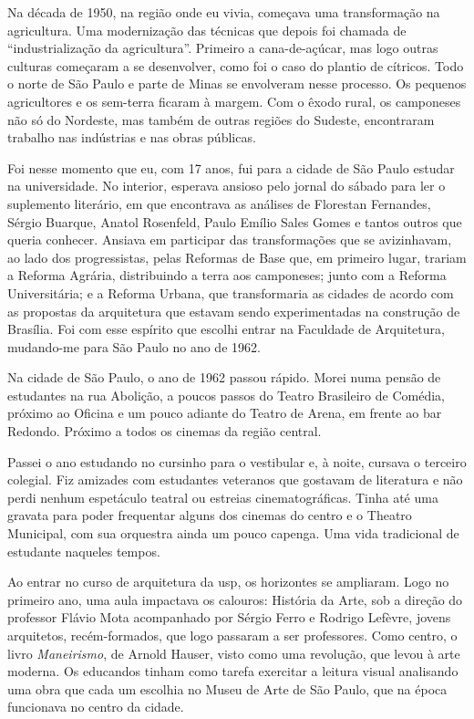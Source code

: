 Na década de 1950, na região onde eu vivia, começava uma transformação na
agricultura. Uma modernização das técnicas que depois foi chamada de
“industrialização da agricultura”. Primeiro a cana-de-açúcar, mas logo
outras culturas começaram a se desenvolver, como foi o caso do plantio de
cítricos. Todo o norte de São Paulo e parte de Minas se envolveram nesse
processo. Os pequenos agricultores e os sem-terra ficaram à margem. Com o
êxodo rural, os camponeses não só do Nordeste, mas também de outras
regiões do Sudeste, encontraram trabalho nas indústrias e nas obras
públicas.

Foi nesse momento que eu, com 17 anos, fui para a cidade de São Paulo
estudar na universidade. No interior, esperava ansioso pelo jornal
do sábado para ler o suplemento literário, em que encontrava as análises de
Florestan Fernandes, Sérgio Buarque, Anatol Rosenfeld, Paulo Emílio
Sales Gomes e tantos outros que queria conhecer. Ansiava em participar das
transformações que se avizinhavam, ao lado dos progressistas, pelas
Reformas de Base que, em primeiro lugar, trariam a Reforma Agrária,
distribuindo a terra aos camponeses; junto com a Reforma Universitária; e
a Reforma Urbana, que transformaria as cidades de acordo com as propostas
da arquitetura que estavam sendo experimentadas na construção de
Brasília. Foi com esse espírito que escolhi entrar na Faculdade de
Arquitetura, mudando-me para São Paulo no ano de 1962.

\subject{São Paulo e a {\cap fau}}

Na cidade de São Paulo, o ano de 1962 passou rápido. Morei numa pensão de
estudantes na rua Abolição, a poucos passos do Teatro Brasileiro de
Comédia, próximo ao Oficina e um pouco adiante do Teatro de Arena, em
frente ao bar Redondo. Próximo a todos os cinemas da região central.

Passei o ano estudando no cursinho para o vestibular e, à noite, cursava
o terceiro colegial. Fiz amizades com estudantes veteranos que gostavam
de literatura e não perdi nenhum espetáculo teatral ou estreias
cinematográficas. Tinha até uma gravata para poder frequentar alguns dos
cinemas do centro e o Theatro Municipal, com sua orquestra ainda um pouco
capenga. Uma vida tradicional de estudante naqueles tempos.

Ao entrar no curso de arquitetura da {\sc usp}, os horizontes se ampliaram.
Logo no primeiro ano, uma aula impactava os calouros: História
da Arte, sob a direção do professor Flávio Mota acompanhado por Sérgio
Ferro e Rodrigo Lefèvre, jovens arquitetos, recém-formados, que logo
passaram a ser professores. Como centro, o livro {\it Maneirismo}, de Arnold
Hauser, visto como uma revolução, que levou à arte moderna.
Os educandos tinham como tarefa exercitar a leitura visual analisando
uma obra que cada um escolhia no Museu de Arte de São Paulo, que na época
funcionava no centro da cidade.

